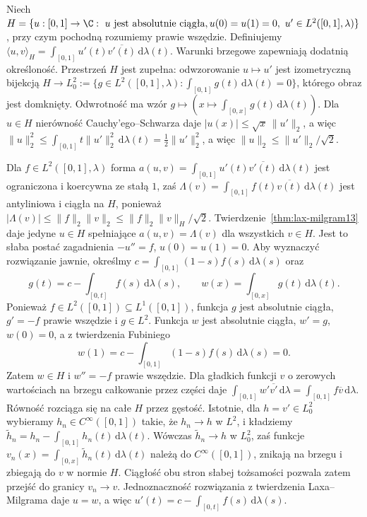 \begin{przyklad}
\label{ex:weak-poisson13}
Niech $H=\{u:[0,1]\to\C:\ u\text{ jest absolutnie ciągła},
u(0)=u(1)=0,\ u'\in L^2([0,1],\lambda)\}$,
przy czym pochodną rozumiemy prawie wszędzie.
Definiujemy $\langle u,v\rangle_H=
\int_{[0,1]}u'(t)\overline{v'(t)}\,\mathrm d\lambda(t)$.
Warunki brzegowe zapewniają dodatnią określoność. Przestrzeń $H$
jest zupełna: odwzorowanie $u\mapsto u'$ jest izometryczną bijekcją
$H\to L^2_0:=\{g\in L^2([0,1],\lambda):
\int_{[0,1]}g(t)\,\mathrm d\lambda(t)=0\}$,
którego obraz jest domknięty. Odwrotność ma wzór
$g\mapsto(x\mapsto\int_{[0,x]}g(t)\,\mathrm d\lambda(t))$.
Dla $u\in H$ nierówność Cauchy'ego--Schwarza daje
$|u(x)|\le\sqrt{x}\,\|u'\|_2$, a więc
$\|u\|_2^2\le\int_{[0,1]}t\|u'\|_2^2\,\mathrm d\lambda(t)
=\frac12\|u'\|_2^2$, a więc
$\|u\|_2\le\|u'\|_2/\sqrt2$.

Dla $f\in L^2([0,1],\lambda)$ forma
$a(u,v)=\int_{[0,1]}u'(t)\overline{v'(t)}\,\mathrm d\lambda(t)$
jest ograniczona i koercywna ze stałą $1$, zaś
$\Lambda(v)=\int_{[0,1]}f(t)\overline{v(t)}\,\mathrm d\lambda(t)$
jest antyliniowa i ciągła na $H$, ponieważ
$|\Lambda(v)|\le\|f\|_2\|v\|_2
\le\|f\|_2\|v\|_H/\sqrt2$.
Twierdzenie~\ref{thm:lax-milgram13} daje jedyne $u\in H$
spełniające $a(u,v)=\Lambda(v)$ dla wszystkich $v\in H$.
Jest to słaba postać zagadnienia $-u''=f$, $u(0)=u(1)=0$.
Aby wyznaczyć rozwiązanie jawnie, określmy
$c=\int_{[0,1]}(1-s)f(s)\,\mathrm d\lambda(s)$ oraz
\[
 g(t)=c-\int_{[0,t]}f(s)\,\mathrm d\lambda(s),\qquad
 w(x)=\int_{[0,x]}g(t)\,\mathrm d\lambda(t).
\]
Ponieważ $f\in L^2([0,1])\subseteq L^1([0,1])$,
funkcja $g$ jest absolutnie ciągła, $g'=-f$ prawie wszędzie
i $g\in L^2$. Funkcja $w$ jest absolutnie ciągła,
$w'=g$, $w(0)=0$, a z twierdzenia Fubiniego
\[
 w(1)=c-\int_{[0,1]}(1-s)f(s)\,\mathrm d\lambda(s)=0.
\]
Zatem $w\in H$ i $w''=-f$ prawie wszędzie.
Dla gładkich funkcji $v$ o zerowych wartościach na brzegu
całkowanie przez części daje
$\int_{[0,1]}w'\overline{v'}\,\mathrm d\lambda
=\int_{[0,1]}f\overline v\,\mathrm d\lambda$.
Równość rozciąga się na całe $H$ przez gęstość.
Istotnie, dla $h=v'\in L^2_0$ wybieramy
$h_n\in C^\infty([0,1])$ takie, że $h_n\to h$ w $L^2$,
i kładziemy
$\widetilde h_n=h_n-\int_{[0,1]}h_n(t)\,\mathrm d\lambda(t)$.
Wówczas $\widetilde h_n\to h$ w $L^2_0$, zaś funkcje
$v_n(x)=\int_{[0,x]}\widetilde h_n(t)\,\mathrm d\lambda(t)$
należą do $C^\infty([0,1])$, znikają na brzegu i zbiegają
do $v$ w normie $H$. Ciągłość obu stron słabej tożsamości
pozwala zatem przejść do granicy $v_n\to v$.
Jednoznaczność rozwiązania z twierdzenia Laxa--Milgrama
daje $u=w$, a więc
$u'(t)=c-\int_{[0,t]}f(s)\,\mathrm d\lambda(s)$.
\end{przyklad}


